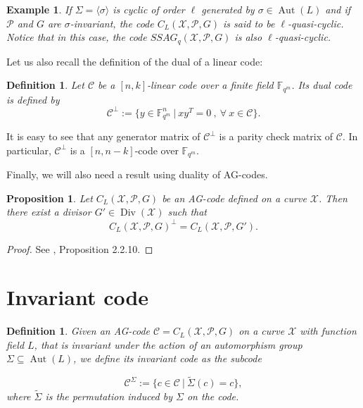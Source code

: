 \documentclass[10pt]{article}
\newtheorem{def1}[thm]{Definition}
\newtheorem{expl}[thm]{Example}
\newtheorem{prop1}[thm]{Proposition}
\newcommand{\s}{\vspace{0.3cm}}
\newcommand{\fqm}{\mathbb{F}_{q^m}}
\newcommand{\su}{\subseteq}
\newcommand{\X}{\mathcal{X}}
\newcommand{\PR}{\mathcal{P}}
\newcommand{\Div}{\operatorname{Div}}
\newcommand{\Aut}{\operatorname{Aut}}
\begin{document}
\s

\begin{expl} 
\rm If $\Sigma = \langle\sigma\rangle$ is cyclic of order $\ell$ generated by $\sigma \in \Aut(L)$ and if $\PR$ and $G$ are $\sigma$-invariant, the code $C_L(\X,\PR,G)$ is said to be $\ell$-quasi-cyclic. Notice that in this case, the code $SSAG_q(\X,\PR,G)$ is also $\ell$-quasi-cyclic.
\end{expl}

\s

Let us also recall the definition of the dual of a linear code:

\s

\begin{def1}
Let $\mathcal{C}$ be a $[n,k]$-linear code over a finite field $\fqm$. Its dual code is defined by 
\[\mathcal{C}^{\perp} := \{ y \in \fqm^n \ | \ xy^T = 0 \ , \ \forall \ x \in \mathcal{C}\}.\]
\end{def1}
It is easy to see that any generator matrix of $\mathcal{C}^{\perp}$ is a parity check matrix of $\mathcal{C}$. In particular, $\mathcal{C}^{\perp}$ is a $[n,n-k]$-code over $\fqm$.

\s

Finally, we will also need a result using duality of AG-codes.

\s

\begin{prop1} \label{dual}
Let $C_L(\X,\PR,G)$ be an AG-code defined on a curve $\X$. Then there exist a divisor $G' \in \Div(\X)$ such that 
\[C_L(\X,\PR,G)^{\perp} = C_L(\X,\PR,G').\]
\end{prop1}

\s

\begin{proof}
See \cite{Sti}, Proposition 2.2.10.
\end{proof}

\section{Invariant code}

\s

\begin{def1} Given an AG-code $\mathcal{C} = C_L(\X,\PR,G)$ on a curve $\X$ with function field $L$, that is invariant under the action of an automorphism group $\Sigma \su \Aut(L)$, we define its invariant code as the subcode 

\[\mathcal{C}^{\Sigma} := \{c \in \mathcal{C} \ | \ \tilde{\Sigma}(c)=c\},\]
where $\tilde{\Sigma}$ is the permutation induced by $\Sigma$ on the code.
\end{def1}
\s
\end{document}

